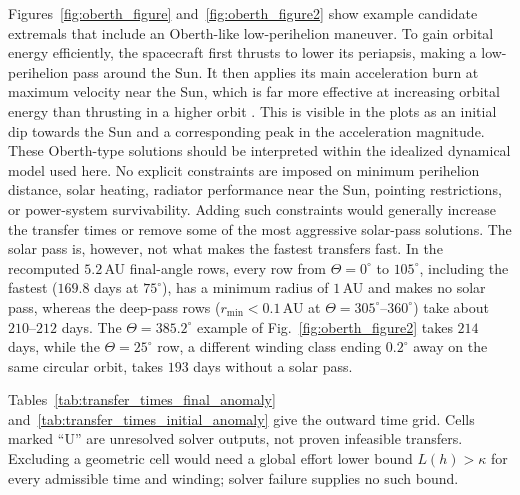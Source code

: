 \documentclass[journal,a4paper]{IEEEtran}
\begin{document}
Figures~\ref{fig:oberth_figure} and~\ref{fig:oberth_figure2} show example candidate extremals that include an Oberth-like low-perihelion maneuver. To gain orbital energy efficiently, the spacecraft first thrusts to lower its periapsis, making a low-perihelion pass around the Sun. It then applies its main acceleration burn at maximum velocity near the Sun, which is far more effective at increasing orbital energy than thrusting in a higher orbit \cite{Oberth1923}. This is visible in the plots as an initial dip towards the Sun and a corresponding peak in the acceleration magnitude. These Oberth-type solutions should be interpreted within the idealized dynamical model used here. No explicit constraints are imposed on minimum perihelion distance, solar heating, radiator performance near the Sun, pointing restrictions, or power-system survivability. Adding such constraints would generally increase the transfer times or remove some of the most aggressive solar-pass solutions.
The solar pass is, however, not what makes the fastest transfers fast. In the recomputed $5.2$\,AU final-angle rows, every row from $\Theta=0^\circ$ to $105^\circ$, including the fastest ($169.8$ days at $75^\circ$), has a minimum radius of $1$\,AU and makes no solar pass, whereas the deep-pass rows ($r_{\min}<0.1$\,AU at $\Theta=305^\circ$--$360^\circ$) take about $210$--$212$ days. The $\Theta=385.2^\circ$ example of Fig.~\ref{fig:oberth_figure2} takes $214$ days, while the $\Theta=25^\circ$ row, a different winding class ending $0.2^\circ$ away on the same circular orbit, takes $193$ days without a solar pass.

Tables~\ref{tab:transfer_times_final_anomaly} and~\ref{tab:transfer_times_initial_anomaly} give the outward time grid. Cells marked ``U'' are unresolved solver outputs, not proven infeasible transfers. Excluding a geometric cell would need a global effort lower bound $L(h)>\kappa$ for every admissible time and winding; solver failure supplies no such bound.
\end{document}
